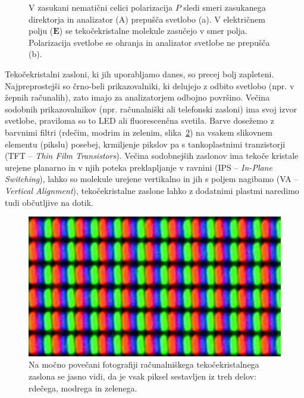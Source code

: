 \begin{figure}[ht]
\centering
\def\svgwidth{110truemm} 

\caption{V zasukani nematični celici polarizacija $P$ sledi smeri zasukanega 
direktorja in analizator (A) prepušča svetlobo (a). V električnem polju 
($\mathbf{E}$) se tekočekristalne molekule zasučejo v smer polja. 
Polarizacija svetlobe se ohranja in analizator svetlobe ne prepušča (b).}
\label{LCD1}
\end{figure}
\begin{remark}
Tekočekristalni zasloni, ki jih uporabljamo danes, so precej bolj zapleteni.
Najpreprostejši so črno-beli prikazovalniki, ki delujejo z odbito svetlobo (npr. 
v žepnih računalih), zato imajo za analizatorjem odbojno površino. Večina 
sodobnih prikazovalnikov (npr. računalniški ali telefonski zasloni) ima svoj izvor svetlobe, 
praviloma so to LED ali fluorescenčna svetila.
Barve dosežemo z barvnimi filtri (rdečim, modrim in zelenim, slika~\ref{fig:LCD}) na vsakem 
slikovnem elementu (pikslu) posebej, krmiljenje pikslov pa s tankoplastnimi 
tranzistorji (TFT -- {\it Thin Film Transistors}). Večina
sodobnejših zaslonov ima tekoče kristale urejene planarno in v njih poteka
preklapljanje v ravnini (IPS -- {\it In-Plane Switching}), lahko so molekule
urejene vertikalno in jih s poljem nagibamo (VA -- {\it Vertical Alignment}), tekočekristalne 
zaslone lahko z dodatnimi plastmi naredimo tudi občutljive na dotik.
\end{remark}
\begin{figure}[ht]
\centering
\includegraphics[width=95truemm]{slike/09_LCD.jpg}
\caption{Na močno povečani fotografiji računalniškega tekočekristalnega zaslona se 
jasno vidi, da je vsak piksel sestavljen iz treh delov: rdečega, modrega in zelenega.}
\label{fig:LCD}
\end{figure}

